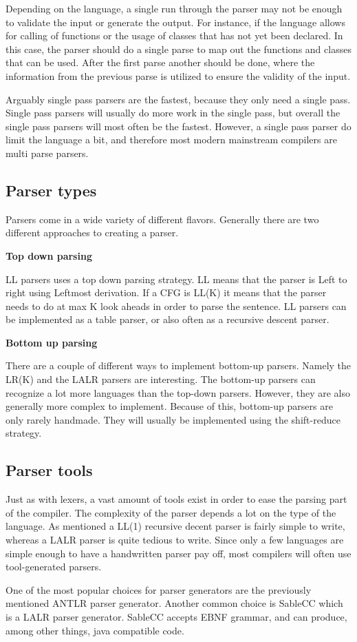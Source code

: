Depending on the language, a single run through the parser may not be enough to validate the input or generate the output. 
For instance, if the language allows for calling of functions or the usage of classes that has not yet been declared.
In this case, the parser should do a single parse to map out the functions and classes that can be used. 
After the first parse another should be done, where the information from the previous parse is utilized to ensure the validity of the input. 

Arguably single pass parsers are the fastest, because they only need a single pass. 
Single pass parsers will usually do more work in the single pass, but overall the single pass parsers will most often be the fastest.
However, a single pass parser do limit the language a bit, and therefore most modern mainstream compilers are multi parse parsers.

\subsection{Parser types}

Parsers come in a wide variety of different flavors. 
Generally there are two different approaches to creating a parser.

\textbf{Top down parsing}

LL parsers uses a top down parsing strategy. 
LL means that the parser is Left to right using Leftmost derivation. 
If a CFG is LL(K) it means that the parser needs to do at max K look aheads in order to parse the sentence. 
LL parsers can be implemented as a table parser, or also often as a recursive descent parser. 

\textbf{Bottom up parsing}

There are a couple of different ways to implement bottom-up parsers. 
Namely the LR(K) and the LALR parsers are interesting. 
The bottom-up parsers can recognize a lot more languages than the top-down parsers.
However, they are also generally more complex to implement.
Because of this, bottom-up parsers are only rarely handmade.
They will usually be implemented using the shift-reduce strategy.


\subsection{Parser tools}

Just as with lexers, a vast amount of tools exist in order to ease the parsing part of the compiler. 
The complexity of the parser depends a lot on the type of the language. 
As mentioned a LL(1) recursive decent parser is fairly simple to write, whereas a LALR parser is quite tedious to write. 
Since only a few languages are simple enough to have a handwritten parser pay off, most compilers will often use tool-generated parsers.

One of the most popular choices for parser generators are the previously mentioned ANTLR parser generator. 
Another common choice is SableCC which is a LALR parser generator.
SableCC accepts EBNF grammar, and can produce, among other things, java compatible code.